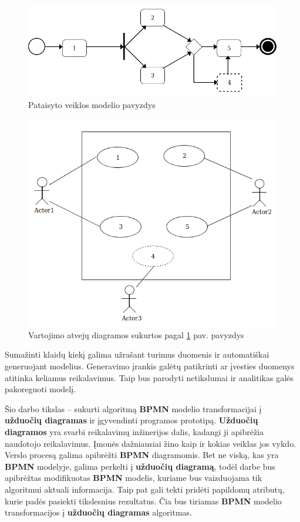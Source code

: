 \documentclass{VUMIFInfBakalaurinis}
\begin{document}
\begin{figure}[H]
	\centering
	\includegraphics[width=\textwidth]{img/bad_modeling/corrected_model}
	\caption{Pataisyto veiklos modelio pavyzdys}
	\label{img:corrected_model}
\end{figure}
\begin{figure}[H]
	\centering
	\includegraphics[width=15cm]{img/bad_modeling/corrected_model_use_cases}
	\caption{Vartojimo atvejų diagramos sukurtos pagal \ref{img:corrected_model} pav. pavyzdys}
	\label{img:corrected_model_use_cases}
\end{figure}

Sumažinti klaidų kiekį galima užrašant turimus duomenis ir automatiškai generuojant modelius. Generavimo įrankis galėtų patikrinti ar įvesties duomenys atitinka keliamus reikalavimus. Taip bus parodyti netikslumai ir analitikas galės pakoreguoti modelį.

Šio darbo tikslas – sukurti algoritmą \textbf{BPMN} modelio transformacijai į \textbf{užduočių diagramas} ir įgyvendinti programos prototipą. \textbf{Užduočių diagramos} yra svarbi reikalavimų inžinerijos dalis, kadangi ji apibrėžia naudotojo reikalavimus. Įmonės dažniausiai žino kaip ir kokias veiklas jos vykdo. Verslo procesą galima apibrėžti \textbf{BPMN} diagramomis. Bet ne viską, kas yra \textbf{BPMN} modelyje, galima perkelti į \textbf{užduočių diagramą}, todėl darbe bus apibrėžtas modifikuotas \textbf{BPMN} modelis, kuriame bus vaizduojama tik algoritmui aktuali informacija. Taip pat gali tekti pridėti papildomų atributų, kurie padės pasiekti tikslesnius rezultatus. Čia bus tiriamas \textbf{BPMN} modelio transformacijos į \textbf{užduočių diagramas} algoritmas.
\end{document}
